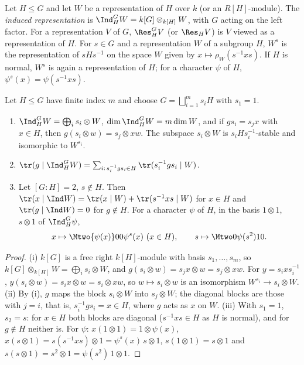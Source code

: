 \begin{definition}\label{def:reps:induction}
Let $H\le G$ and let $W$ be a representation of $H$ over $k$ (or an $R[H]$-module). The \emph{induced representation} is
$\Ind_H^GW=k[G]\otimes_{k[H]}W$, with $G$ acting on the left factor. For a representation $V$ of $G$, $\Res^G_HV$ (or $\Res_HV$) is $V$ viewed as a
representation of $H$. For $s\in G$ and a representation $W$ of a subgroup $H$, $W^s$ is the representation of $sHs^{-1}$ on the space $W$
given by $x\mapsto\rho_W(s^{-1}xs)$. If $H$ is normal, $W^s$ is again a representation of $H$; for a character $\psi$ of $H$, $\psi^s(x)=\psi(s^{-1}xs)$.
\end{definition}

\begin{proposition}\label{prop:reps:induction}
Let $H\le G$ have finite index $m$ and choose $G=\bigsqcup_{i=1}^ms_iH$ with $s_1=1$.
\begin{enumerate}[label=(\roman*)]
\item $\Ind_H^GW=\bigoplus_is_i\otimes W$, $\dim\Ind_H^GW=m\dim W$, and if $gs_i=s_jx$ with $x\in H$, then $g(s_i\otimes w)=s_j\otimes xw$. The subspace
$s_i\otimes W$ is $s_iHs_i^{-1}$-stable and isomorphic to $W^{s_i}$.
\item $\tr(g\mid\Ind_H^GW)=\sum_{i:\,s_i^{-1}gs_i\in H}\tr(s_i^{-1}gs_i\mid W)$.
\item Let $[G:H]=2$, $s\notin H$. Then $\tr(x\mid\Ind W)=\tr(x\mid W)+\tr(s^{-1}xs\mid W)$ for $x\in H$ and $\tr(g\mid\Ind W)=0$ for $g\notin H$. For a
character $\psi$ of $H$, in the basis $1\otimes1$, $s\otimes1$ of $\Ind_H^G\psi$,
\[
x\mapsto\Mtwo{\psi(x)}00{\psi^s(x)}\ (x\in H),\qquad s\mapsto\Mtwo0{\psi(s^2)}10.
\]
\end{enumerate}
\end{proposition}

\begin{proof}
(i) $k[G]$ is a free right $k[H]$-module with basis $s_1,\dots,s_m$, so $k[G]\otimes_{k[H]}W=\bigoplus_is_i\otimes W$, and
$g(s_i\otimes w)=s_jx\otimes w=s_j\otimes xw$. For $y=s_ixs_i^{-1}$, $y(s_i\otimes w)=s_ix\otimes w=s_i\otimes xw$, so $w\mapsto s_i\otimes w$ is an isomorphism
$W^{s_i}\to s_i\otimes W$.
(ii) By (i), $g$ maps the block $s_i\otimes W$ into $s_j\otimes W$; the diagonal blocks are those with $j=i$, that is, $s_i^{-1}gs_i=x\in H$, where $g$ acts
as $x$ on $W$.
(iii) With $s_1=1$, $s_2=s$: for $x\in H$ both blocks are diagonal ($s^{-1}xs\in H$ as $H$ is normal), and for $g\notin H$ neither is. For $\psi$:
$x(1\otimes1)=1\otimes\psi(x)$, $x(s\otimes1)=s(s^{-1}xs)\otimes1=\psi^s(x)\,s\otimes1$, $s(1\otimes1)=s\otimes1$ and $s(s\otimes1)=s^2\otimes1=\psi(s^2)\,1\otimes1$.
\end{proof}

